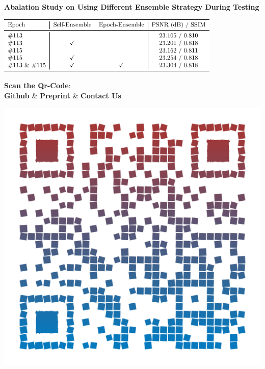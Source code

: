 \documentclass[landscape,a0paper,fontscale=0.292]{baposter}
\begin{document}
\begin{poster}
{    \begin{minipage}[t]{0.6\textwidth}
        \vspace{-1.4em}
        \textbf{Abalation Study on Using Different Ensemble Strategy During Testing} 
        \begin{center}
            \includegraphics[width=0.8\textwidth]{images/ablation}
        \end{center}
    \end{minipage}
    \hfill
    \begin{minipage}[t]{0.4\textwidth}
        \vspace{0.1em}
        \begin{center}
        \begin{minipage}{0.7\linewidth}
            \begin{center}
            \textbf{Scan the Qr-Code}: \\
            \vspace{0.5em}\textbf{Github} \& \textbf{Preprint} \& \textbf{Contact Us}
            \end{center}
        \end{minipage}
        \begin{minipage}{0.24\linewidth}
            \begin{center}
                \includegraphics[width=\linewidth]{images/qr-code}
            \end{center}
        \end{minipage}
        \end{center}
    \end{minipage}
}


\end{poster}
\end{document}

